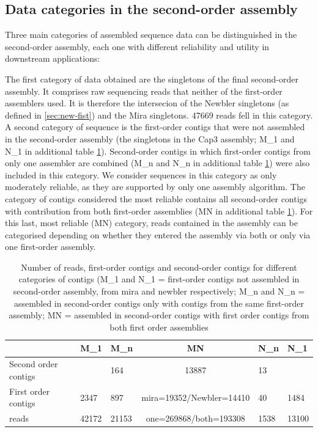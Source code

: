 \documentclass[12pt,a4paper]{article}
\begin{document}
\newpage
\subsection{Data categories in the second-order assembly}
\label{sec:data-categ-second}

Three main categories of assembled sequence data can be distinguished
in the second-order assembly, each one with different reliability and
utility in downstream applications:

The first category of data obtained are the singletons of the final
second-order assembly. It comprises raw sequencing reads that neither
of the first-order assemblers used. It is therefore the intersecion of
the Newbler singletons (as defined in \ref{sec:new-fist}) and the Mira
singletons. 47669 reads fell in this category. A
second category of sequence is the first-order contigs that were not
assembled in the second-order assembly (the singletons in the Cap3
assembly; M\_1 and N\_1 in additional table
\ref{tab:categ}). Second-order contigs in which first-order contigs
from only one assembler are combined (M\_n and N\_n in additional
table \ref{tab:categ}) were also included in this category. We
consider sequences in this category as only moderately reliable, as
they are supported by only one assembly algorithm. The category of
contigs considered the most reliable contains all second-order contigs
with contribution from both first-order assemblies (MN in additional
table \ref{tab:categ}). For this last, most reliable (MN) category,
reads contained in the assembly can be categorised depending on
whether they entered the assembly via both or only via one first-order
assembly.

\begin{table}[ht]
\begin{center}
\begin{tabular}{p{2.5cm}llcll}
  \hline
 & M\_1 & M\_n & MN & N\_n & N\_1 \\ 
  \hline
Second order contigs &   & 164 & 13887 & 13 &   \\ 
  First order contigs & 2347 & 897 & mira=19352/Newbler=14410 & 40 & 1484 \\ 
  reads & 42172 & 21153 & one=269868/both=193308 & 1538 & 13100 \\ 
   \hline
\end{tabular}
\caption[Number of reads, first-order contigs and second-order contigs for different categories of contigs]{Number of reads, first-order contigs and second-order contigs for different categories of contigs (M\_1 and N\_1 = first-order contigs not assembled in second-order assembly, from mira and newbler respectively; M\_n and N\_n =  assembled in second-order contigs only with contigs from the same first-order assembly; MN = assembled in second-order contigs with first order contigs from both first order assemblies}
\label{tab:categ}
\end{center}
\end{table}
\newpage
\end{document}
